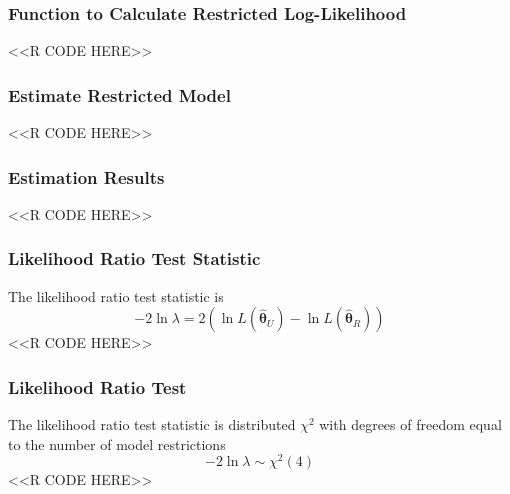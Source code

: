 \documentclass{beamer}
\begin{document}
\begin{frame}[fragile]\frametitle{Function to Calculate Restricted Log-Likelihood}
    <<R CODE HERE>>
\end{frame}

\begin{frame}[fragile]\frametitle{Estimate Restricted Model}
    <<R CODE HERE>>
\end{frame}

\begin{frame}[fragile]\frametitle{Estimation Results}
    <<R CODE HERE>>
\end{frame}

\begin{frame}[fragile]\frametitle{Likelihood Ratio Test Statistic}
	The likelihood ratio test statistic is
    $$-2 \ln \lambda = 2 \left( \ln L(\widehat{\bm{\theta}}_U) - \ln L(\widehat{\bm{\theta}}_R) \right)$$
    <<R CODE HERE>>
\end{frame}

\begin{frame}[fragile]\frametitle{Likelihood Ratio Test}
	The likelihood ratio test statistic is distributed $\chi^2$ with degrees of freedom equal to the number of model restrictions
    $$-2 \ln \lambda \sim \chi^2(4)$$
    <<R CODE HERE>>
\end{frame}
\end{document}
